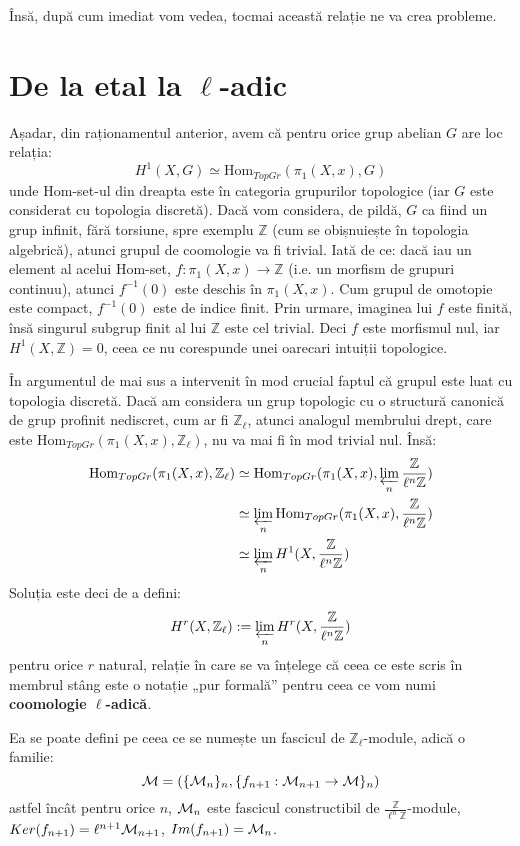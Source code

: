 \documentclass[13pt,openany,oneside]{book}
\begin{document}
Însă, după cum imediat vom vedea, tocmai această relație ne va crea probleme.

\chapter{De la etal la \texorpdfstring{$\ell$}{l}-adic}

Așadar, din raționamentul anterior, avem că pentru orice grup abelian $G$ are loc relația:
$$H^1(X,G)\simeq \text{Hom}_{TopGr}(\pi_1(X,x),G)$$
unde Hom-set-ul din dreapta este în categoria grupurilor topologice (iar $G$ este considerat cu topologia discretă). Dacă vom considera, de pildă, $G$ ca fiind un grup infinit, fără torsiune, spre exemplu $\mathbb{Z}$ (cum se obișnuiește în topologia algebrică), atunci grupul de coomologie va fi trivial. Iată de ce: dacă iau un element al acelui Hom-set, $f: \pi_1(X,x) \rightarrow \mathbb{Z}$ (i.e. un morfism de grupuri continuu), atunci $f^{-1}(0)$ este deschis în $\pi_1(X,x)$. Cum grupul de omotopie este compact, $f^{-1}(0)$ este de indice finit. Prin urmare, imaginea lui $f$ este finită, însă singurul subgrup finit al lui $\mathbb{Z}$ este cel trivial. Deci $f$ este morfismul nul, iar $H^1(X,\mathbb{Z})=0$, ceea ce nu corespunde unei oarecari intuiții topologice.

În argumentul de mai sus a intervenit în mod crucial faptul că grupul este luat cu topologia discretă. Dacă am considera un grup topologic cu o structură canonică de grup profinit nediscret, cum ar fi $\mathbb{Z}_\ell$, atunci analogul membrului drept, care este $\text{Hom}_{TopGr}(\pi_1(X,x),\mathbb{Z}_\ell)$, nu va mai fi în mod trivial nul. Însă:
\begin{align*}
\text{Hom}_{TopGr}(\pi_1(X,x),\mathbb{Z}_\ell)&\simeq \text{Hom}_{TopGr}(\pi_1(X,x),\varprojlim_n \frac{\mathbb{Z}}{\ell^n\mathbb{Z}}) \\
&\simeq \varprojlim_n \text{Hom}_{TopGr}(\pi_1(X,x), \frac{\mathbb{Z}}{\ell^n\mathbb{Z}}) \\
&\simeq \varprojlim_n H^1(X, \frac{\mathbb{Z}}{\ell^n\mathbb{Z}}) \\
\end{align*}
Soluția este deci de a defini:
$$H^r(X,\mathbb{Z}_\ell):=\varprojlim_n H^r(X, \frac{\mathbb{Z}}{\ell^n\mathbb{Z}})$$
pentru orice $r$ natural, relație în care se va înțelege că ceea ce este scris în membrul stâng este o notație „pur formală” pentru ceea ce vom numi {\bf coomologie $\ell$-adică}.

Ea se poate defini pe ceea ce se numește un fascicul de $\mathbb{Z}_\ell$-module, adică o familie:
$$\mathcal{M}=(\{\mathcal{M}_n\}_n,\{f_{n+1}:\mathcal{M}_{n+1}\rightarrow\mathcal{M}\}_n)$$
astfel încât pentru orice $n$, $\mathcal{M}_n$ este fascicul constructibil de $\frac{\mathbb{Z}}{\ell^n\mathbb{Z}}$-module, $Ker(f_{n+1})=\ell^{n+1}\mathcal{M}_{n+1}$, $Im(f_{n+1})=\mathcal{M}_n$.
\end{document}
